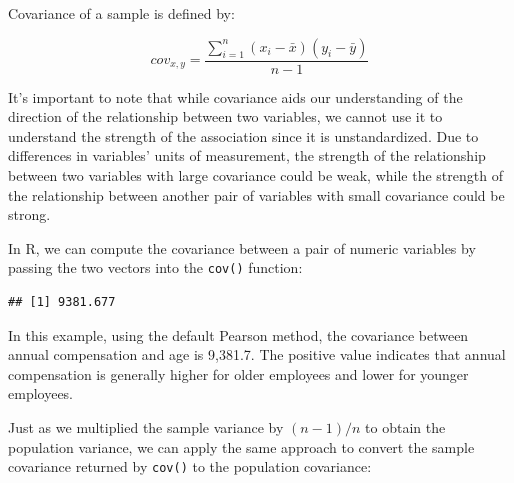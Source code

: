 \documentclass[
]{book}
\newenvironment{Shaded}{\begin{snugshade}}{\end{snugshade}}
\newcommand{\AttributeTok}[1]{\textcolor[rgb]{0.77,0.63,0.00}{#1}}
\newcommand{\CommentTok}[1]{\textcolor[rgb]{0.56,0.35,0.01}{\textit{#1}}}
\newcommand{\DecValTok}[1]{\textcolor[rgb]{0.00,0.00,0.81}{#1}}
\newcommand{\FunctionTok}[1]{\textcolor[rgb]{0.00,0.00,0.00}{#1}}
\newcommand{\NormalTok}[1]{#1}
\newcommand{\SpecialCharTok}[1]{\textcolor[rgb]{0.00,0.00,0.00}{#1}}
\newcommand{\StringTok}[1]{\textcolor[rgb]{0.31,0.60,0.02}{#1}}
\begin{document}
Covariance of a sample is defined by:

\[ cov_{x,y} = \frac{\displaystyle\sum_{i=1}^{n} (x_{i}-\bar{x})(y_{i}-\bar{y})}{n-1} \]

It's important to note that while covariance aids our understanding of the direction of the relationship between two variables, we cannot use it to understand the strength of the association since it is unstandardized. Due to differences in variables' units of measurement, the strength of the relationship between two variables with large covariance could be weak, while the strength of the relationship between another pair of variables with small covariance could be strong.

In R, we can compute the covariance between a pair of numeric variables by passing the two vectors into the \texttt{cov()} function:

\begin{Shaded}
\end{Shaded}

\begin{verbatim}
## [1] 9381.677
\end{verbatim}

In this example, using the default Pearson method, the covariance between annual compensation and age is 9,381.7. The positive value indicates that annual compensation is generally higher for older employees and lower for younger employees.

Just as we multiplied the sample variance by \((n - 1) / n\) to obtain the population variance, we can apply the same approach to convert the sample covariance returned by \texttt{cov()} to the population covariance:

\begin{Shaded}
\end{Shaded}
\end{document}
